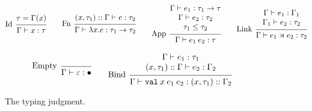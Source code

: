 \documentclass{article}
\theoremstyle{definition}
\newcommand*{\cons}{::}
\newcommand*{\link}[2]{{#1}\rtimes{#2}}
\newcommand*{\Lete}{\mathtt{val}}
\begin{document}
\begin{figure}[h!]
  \footnotesize
  \begin{flushright}
  \end{flushright}
  \centering
  \vspace{0pt} %
  \[
    \begin{prooftree}
      \hypo{\tau=\Gamma(x)}
      \infer[left label=Id]1{
      \Gamma\vdash x:\tau
      }
    \end{prooftree}\qquad
    \begin{prooftree}
      \hypo{(x,\tau_1)\cons\Gamma\vdash e:\tau_2}
      \infer[left label=Fn]1{
      \Gamma\vdash\lambda x.e:\tau_1\rightarrow\tau_2
      }
    \end{prooftree}\qquad
    \begin{prooftree}
      \hypo{
        \begin{matrix}
          \Gamma\vdash e_1:\tau_1\rightarrow\tau \\
          \Gamma\vdash e_2:\tau_2                \\
          \tau_1\le\tau_2
        \end{matrix}
      }
      \infer[left label={App}]1{
      \Gamma\vdash e_{1}\:e_{2}:\tau
      }
    \end{prooftree}\qquad
    \begin{prooftree}
      \hypo{
        \begin{matrix}
          \Gamma\vdash e_1:\Gamma_1 \\
          \Gamma_1\vdash e_2:\tau_2
        \end{matrix}
      }
      \infer[left label=Link]1{
      \Gamma\vdash\link{e_{1}}{e_{2}}:\tau_2
      }
    \end{prooftree}
  \]

  \[
    \begin{prooftree}
      \infer[left label=Empty]0{
      \Gamma\vdash\varepsilon:\bullet
      }
    \end{prooftree}\qquad
    \begin{prooftree}
      \hypo{
        \begin{matrix}
          \Gamma\vdash e_1:\tau_1 \\
          (x, \tau_1)\cons\Gamma\vdash e_2:\Gamma_2
        \end{matrix}
      }
      \infer[left label=Bind]1{
      \Gamma\vdash\Lete\:x\:e_1\:e_2:(x,\tau_1)\cons\Gamma_2
      }
    \end{prooftree}
  \]
  \caption{The typing judgment.}
  \label{fig:exttypjudge}
\end{figure}
\end{document}
